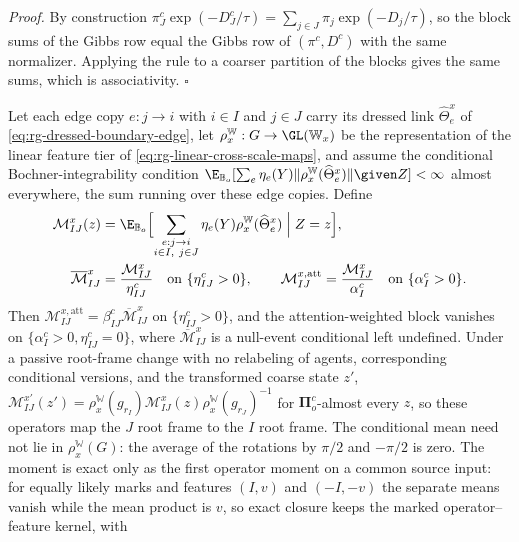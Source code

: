 \noindent\emph{Proof.}
By construction $\pi^c_J\exp(-D^c_J/\tau)=\sum_{j\in J}\pi_j\exp(-D_j/\tau)$, so the
block sums of the Gibbs row equal the Gibbs row of $(\pi^c,D^c)$ with the same
normalizer. Applying the rule to a coarser partition of the blocks gives the same
sums, which is associativity. $\square$

Let each edge copy $e:j\to i$ with $i\in I$ and $j\in J$ carry its dressed link
$\widehat\Theta^x_e$ of \eqref{eq:rg-dressed-boundary-edge}, let
$\rho^{\mathbb W}_x:G\to\GL(\mathbb W_x)$ be the representation of the linear feature tier of
\eqref{eq:rg-linear-cross-scale-maps}, and assume the conditional
Bochner-integrability condition
$\E_{\mathbb B_o}[\sum_e\eta_e(Y)\lVert\rho^{\mathbb W}_x(\widehat\Theta^x_e)\rVert\given Z]<\infty$
almost everywhere, the sum running over these edge copies. Define
\begin{equation}
\begin{split}
\mathcal M^x_{IJ}(z)
&=\E_{\mathbb B_o}\Bigl[\sum_{\substack{e:j\to i\\ i\in I,\ j\in J}}\eta_e(Y)
\rho^{\mathbb W}_x(\widehat\Theta^x_e)\Bigm|Z=z\Bigr],\\
\overline{\mathcal M}^x_{IJ}&=\frac{\mathcal M^x_{IJ}}{\eta^c_{IJ}}
\quad\text{on }\{\eta^c_{IJ}>0\},
\qquad
\mathcal M^{x,\mathrm{att}}_{IJ}=\frac{\mathcal M^x_{IJ}}{\alpha^c_I}
\quad\text{on }\{\alpha^c_I>0\}.
\end{split}
\label{eq:rg-attention-hom-operator}
\end{equation}
Then $\mathcal M^{x,\mathrm{att}}_{IJ}=\beta^c_{IJ}\overline{\mathcal M}^x_{IJ}$ on
$\{\eta^c_{IJ}>0\}$, and the attention-weighted block vanishes on
$\{\alpha^c_I>0,\eta^c_{IJ}=0\}$, where $\overline{\mathcal M}^x_{IJ}$ is a
null-event conditional left undefined. Under a passive root-frame change with no
relabeling of agents, corresponding conditional versions, and the transformed coarse
state $z'$,
$\mathcal M^{x\prime}_{IJ}(z')=\rho^{\mathbb W}_x(g_{r_I})\mathcal M^x_{IJ}(z)\rho^{\mathbb W}_x(g_{r_J})^{-1}$
for $\boldsymbol\Pi^c_o$-almost every $z$, so these operators map the $J$ root frame
to the $I$ root frame. The conditional mean need not lie in $\rho^{\mathbb W}_x(G)$: the average
of the rotations by $\pi/2$ and $-\pi/2$ is zero. The moment is exact only as the
first operator moment on a common source input: for equally likely marks and
features $(I,v)$ and $(-I,-v)$ the separate means vanish while the mean product is
$v$, so exact closure keeps the marked operator--feature kernel, with
